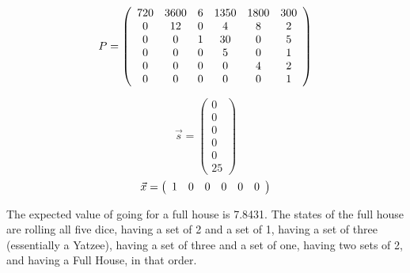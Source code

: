 \[
P=
\left(
\begin{array}{c c c c c c}
720 & 3600 & 6 & 1350 & 1800 & 300\\
0 & 12 & 0 & 4 & 8 & 2\\
0 & 0 & 1 & 30 & 0 & 5\\
0 & 0 & 0 & 5 & 0 & 1\\
0 & 0 & 0 & 0 & 4 & 2\\
0 & 0 & 0 & 0 & 0 & 1\\
\end{array}
\right)
\]

\[
\vec{s}=
\left(
\begin{array}{c}
0\\
0\\
0\\
0\\
0\\
25
\end{array}
\right)
\]
\[
\vec{x}=
\left(
\begin{array}{c c c c c c}
1&0&0&0&0&0
\end{array}
\right)
\]

The expected value of going for a full house is 7.8431. The states of the full
house are rolling all five dice, having a set of 2 and a set of 1, having a set
of three (essentially a Yatzee), having a set of three and a set of one, having
two sets of 2, and having a Full House, in that order.
